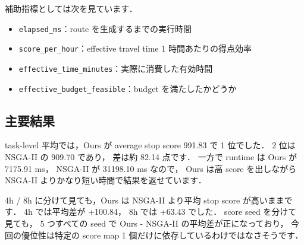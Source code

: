 \documentclass[a4paper,11pt]{article}
\begin{document}
補助指標としては次を見ています．
\begin{itemize}
    \item \texttt{elapsed\_ms}：route を生成するまでの実行時間
    \item \texttt{score\_per\_hour}：effective travel time 1 時間あたりの得点効率
    \item \texttt{effective\_time\_minutes}：実際に消費した有効時間
    \item \texttt{effective\_budget\_feasible}：budget を満たしたかどうか
\end{itemize}

\subsection*{主要結果}
task-level 平均では，Ours が average stop score 991.83 で 1 位でした．
2 位は NSGA-II の 909.70 であり，
差は約 82.14 点です．
一方で runtime は Ours が 7175.91 ms，
NSGA-II が 31198.10 ms なので，
Ours は高 score を出しながら NSGA-II よりかなり短い時間で結果を返せています．

\begin{table}[H]
    \centering
    \small
    \caption{実験1の全体結果（task-level mean）}
\end{table}

4h / 8h に分けて見ても，Ours は NSGA-II より平均 stop score が高いままです．
4h では平均差が +100.84，
8h では +63.43 でした．
score seed を分けて見ても，
5 つすべての seed で Ours - NSGA-II の平均差が正になっており，
今回の優位性は特定の score map 1 個だけに依存しているわけではなさそうです．
\end{document}
